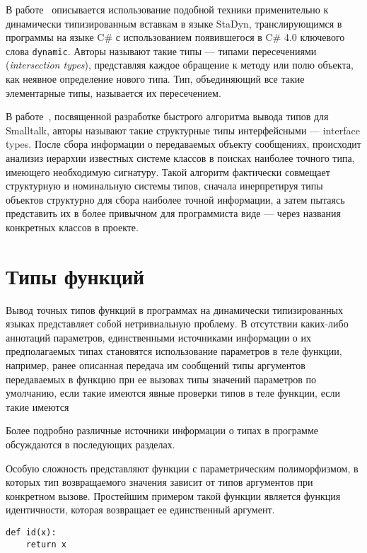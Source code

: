 В работе~\cite{Ortin2011:union} описывается использование подобной техники
применительно к динамически типизированным вставкам в языке StaDyn,
транслирующимся в программы на языке C\# с использованием появившегося в C\# 4.0
ключевого слова \texttt{dynamic}.  Авторы называют такие типы --- типами пересечениями
(\emph{intersection types}), представляя каждое обращение к методу или полю объекта,
как неявное определение нового типа. Тип, объединяющий все такие элементарные
типы, называется их пересечением.

В работе~\cite{Pluquet2009}, посвященной разработке быстрого алгоритма вывода
типов для Smalltalk, авторы называют такие структурные типы интерфейсными ---
interface types. После сбора информации о передаваемых объекту сообщениях,
происходит анализиз иерархии известных системе классов в поисках наиболее
точного типа, имеющего необходимую сигнатуру. Такой алгоритм фактически
совмещает структурную и номинальную системы типов, сначала инерпретируя типы
объектов структурно для сбора наиболее точной информации, а затем пытаясь
представить их в более привычном для программиста виде --- через названия
конкретных классов в проекте.

\section{Типы функций}

Вывод точных типов функций в программах на динамически типизированных языках
представляет собой  нетривиальную проблему. В отсутствии каких-либо аннотаций
параметров, единственными источниками информации о их предполагаемых типах
становятся использование параметров в теле функции, например, ранее описанная
передача им сообщений типы аргументов передаваемых в функцию при ее вызовах
типы значений параметров по умолчанию, если такие имеются явные проверки типов
в теле функции, если такие имеются

Более подробно различные источники информации о типах в программе обсуждаются в
последующих разделах.

Особую сложность представляют функции с параметрическим полиморфизмом, в
которых тип возвращаемого значения зависит от типов аргументов при конкретном
вызове.  Простейшим примером такой функции является функция идентичности,
которая возвращает ее единственный аргумент.

\begin{lstlisting}
def id(x):
    return x
\end{lstlisting}

